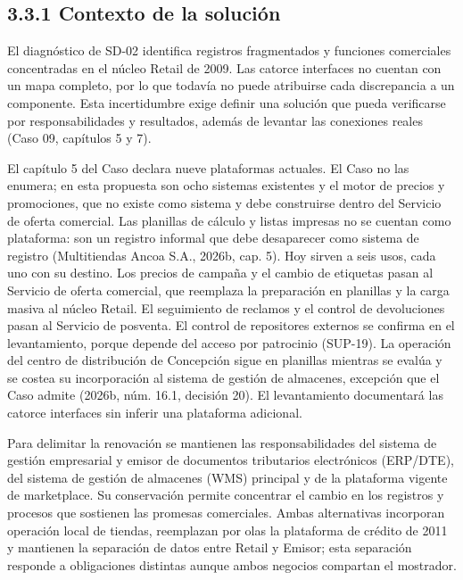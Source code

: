 \documentclass[11pt]{article}
\begin{document}
\subsection{3.3.1 Contexto de la solución}

{El diagnóstico de SD-02 identifica registros fragmentados y funciones comerciales concentradas en el núcleo Retail de 2009. Las catorce interfaces no cuentan con un mapa completo, por lo que todavía no puede atribuirse cada discrepancia a un componente. Esta incertidumbre exige definir una solución que pueda verificarse por responsabilidades y resultados, además de levantar las conexiones reales (Caso 09, capítulos 5 y 7).}

{El capítulo 5 del Caso declara nueve plataformas actuales. El Caso no las enumera; en esta propuesta son ocho sistemas existentes y el motor de precios y promociones, que no existe como sistema y debe construirse dentro del Servicio de oferta comercial. Las planillas de cálculo y listas impresas no se cuentan como plataforma: son un registro informal que debe desaparecer como sistema de registro (Multitiendas Ancoa S.A., 2026b, cap. 5). Hoy sirven a seis usos, cada uno con su destino. Los precios de campaña y el cambio de etiquetas pasan al Servicio de oferta comercial, que reemplaza la preparación en planillas y la carga masiva al núcleo Retail. El seguimiento de reclamos y el control de devoluciones pasan al Servicio de posventa. El control de repositores externos se confirma en el levantamiento, porque depende del acceso por patrocinio (SUP-19). La operación del centro de distribución de Concepción sigue en planillas mientras se evalúa y se costea su incorporación al sistema de gestión de almacenes, excepción que el Caso admite (2026b, núm. 16.1, decisión 20). El levantamiento documentará las catorce interfaces sin inferir una plataforma adicional.}

{Para delimitar la renovación se mantienen las responsabilidades del sistema de gestión empresarial y emisor de documentos tributarios electrónicos (ERP/DTE), del sistema de gestión de almacenes (WMS) principal y de la plataforma vigente de marketplace. Su conservación permite concentrar el cambio en los registros y procesos que sostienen las promesas comerciales. Ambas alternativas incorporan operación local de tiendas, reemplazan por olas la plataforma de crédito de 2011 y mantienen la separación de datos entre Retail y Emisor; esta separación responde a obligaciones distintas aunque ambos negocios compartan el mostrador.}
\end{document}
